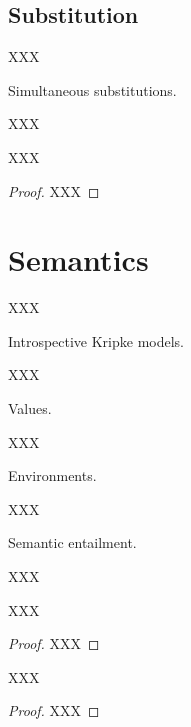 \documentclass{entcs}
\begin{document}


\subsection*{Substitution}
XXX


\begin{definition}
  Simultaneous substitutions.
  
XXX
\end{definition}


\begin{lemma}[Substitution]

XXX
\end{lemma}
\begin{proof}
  XXX
\end{proof}




\section{Semantics}
XXX


\begin{definition}
  Introspective Kripke models.
  
XXX
\end{definition}


\begin{definition}
  Values.
  
XXX
\end{definition}


\begin{definition}
  Environments.

XXX
\end{definition}


\begin{definition}
  Semantic entailment.

XXX
\end{definition}


\begin{lemma}[Accessibility]

XXX
\end{lemma}
\begin{proof}
  XXX
\end{proof}


\begin{theorem}[Soundness]
  
XXX
\end{theorem}
\begin{proof}
  XXX
\end{proof}
\end{document}
